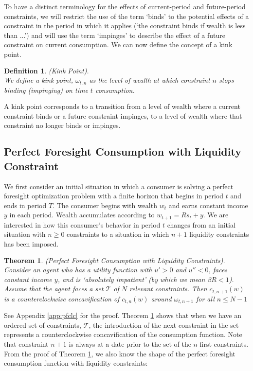 \documentclass[titlepage]{\econtex}
\providecommand{\wAlt}{\omega}
\newtheorem{defn}{Definition}
\newtheorem{theorem}{Theorem}
\begin{document}
To have a distinct terminology for the effects of current-period and future-period constraints, we will restrict the use of the term `binds' to the potential effects of a constraint in the period in which it applies (`the constraint binds if wealth is less than ...') and will use the term `impinges' to describe the effect of a future constraint on current consumption. We can now define the concept of a kink point.
\begin{defn}(Kink Point). \\
	We define a kink point, $\wAlt_{t,n}$ as the level of wealth at which constraint $n$ stops binding (impinging) on time $t$ consumption.
\end{defn}
A kink point corresponds to a transition from a level of wealth where a current constraint binds or a future constraint impinges, to a level of wealth where that constraint no longer binds or impinges.



\subsection{Perfect Foresight Consumption with Liquidity Constraint}\label{subsec:Piecewise}

We first consider an initial situation in which a consumer is solving a perfect foresight optimization problem with a finite horizon that begins in period $t$ and ends in period $T$. The consumer begins with wealth $w_{t}$ and earns constant income ${y}$ in each period. Wealth accumulates according to $w_{t+1} = Rs_{t}+{y}$. We are interested in how this consumer's behavior in period $t$ changes from an initial situation with $n\geq 0$ constraints to a situation in which $n+1$ liquidity constraints has been imposed.

\begin{theorem}\label{thm:pfclc}(Perfect Foresight Consumption with Liquidity Constraints). \\
	Consider an agent who has a utility function with $u'> 0 $ and $u'' < 0$, faces constant income ${y}$, and is `absolutely impatient' (by which we mean $\beta R < 1$). Assume that the agent faces a set $\mathcal{T}$ of $N$ relevant constraints. Then $c_{t,n+1}(w)$ is a counterclockwise concavification of $c_{t,n}(w)$ around $\wAlt_{t,n+1}$ for all $n \leq N-1$
\end{theorem}

See Appendix \ref{app:pfclc} for the proof. Theorem \ref{thm:pfclc} shows that when we have an ordered set of constraints, $\mathcal{T}$, the introduction of the next constraint in the set represents a counterclockwise concavification of the consumption function. Note that constraint $n+1$ is always at a date prior to the set of the $n$ first constraints. From the proof of Theorem \ref{thm:pfclc}, we also know the shape of the perfect foresight consumption function with liquidity constraints:
\end{document}
